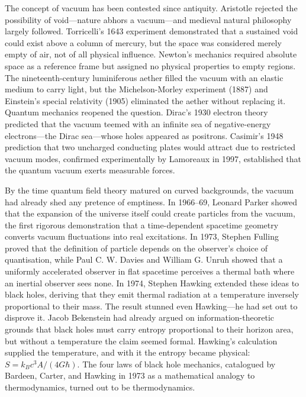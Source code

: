 \begin{historical}
The concept of vacuum has been contested since antiquity. Aristotle rejected the possibility of void—nature abhors a vacuum—and medieval natural philosophy largely followed. Torricelli's 1643 experiment demonstrated that a sustained void could exist above a column of mercury, but the space was considered merely empty of air, not of all physical influence. Newton's mechanics required absolute space as a reference frame but assigned no physical properties to empty regions. The nineteenth-century luminiferous aether filled the vacuum with an elastic medium to carry light, but the Michelson-Morley experiment (1887) and Einstein's special relativity (1905) eliminated the aether without replacing it. Quantum mechanics reopened the question. Dirac's 1930 electron theory predicted that the vacuum teemed with an infinite sea of negative-energy electrons—the Dirac sea—whose holes appeared as positrons. Casimir's 1948 prediction that two uncharged conducting plates would attract due to restricted vacuum modes, confirmed experimentally by Lamoreaux in 1997, established that the quantum vacuum exerts measurable forces.

By the time quantum field theory matured on curved backgrounds, the vacuum had already shed any pretence of emptiness. In 1966–69, Leonard Parker showed that the expansion of the universe itself could create particles from the vacuum, the first rigorous demonstration that a time-dependent spacetime geometry converts vacuum fluctuations into real excitations. In 1973, Stephen Fulling proved that the definition of \QSOpen{}particle\QSClose{} depends on the observer's choice of quantisation, while Paul C. W. Davies and William G. Unruh showed that a uniformly accelerated observer in flat spacetime perceives a thermal bath where an inertial observer sees none. In 1974, Stephen Hawking extended these ideas to black holes, deriving that they emit thermal radiation at a temperature inversely proportional to their mass. The result stunned even Hawking—he had set out to disprove it. Jacob Bekenstein had already argued on information-theoretic grounds that black holes must carry entropy proportional to their horizon area, but without a temperature the claim seemed formal. Hawking's calculation supplied the temperature, and with it the entropy became physical: $S = k_B c^3 A / (4G\hbar)$. The four laws of black hole mechanics, catalogued by Bardeen, Carter, and Hawking in 1973 as a mathematical analogy to thermodynamics, turned out to be thermodynamics.


\end{historical}
